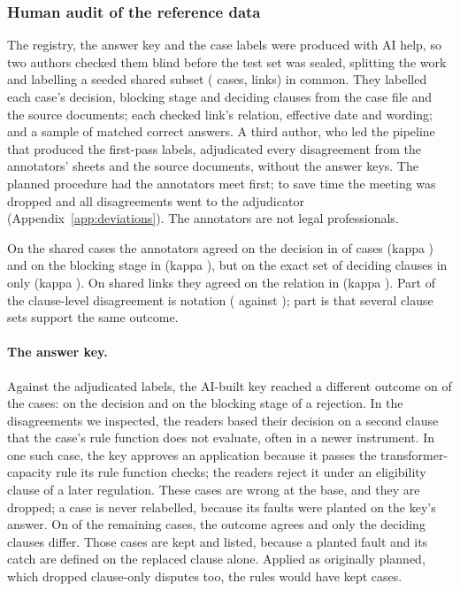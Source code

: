 \subsubsection{Human audit of the reference data}
\label{sec:annotation}
The registry, the answer key and the case labels were produced with AI help, so two authors checked them blind before
the test set was sealed, splitting the work and labelling a seeded shared subset (\NSharedCases{} cases, \NSharedLinks{}
links) in common. They labelled each case's decision, blocking stage and deciding clauses from the case file and the
source documents; each checked link's relation, effective date and wording; and a sample of \NControlsAnnotated{} matched
correct answers. A third author, who led the pipeline that produced the first-pass labels, adjudicated every
disagreement from the annotators' sheets and the source documents, without the answer keys. The planned procedure
had the annotators meet first; to save time the meeting was dropped and all disagreements went to the adjudicator
(Appendix~\ref{app:deviations}). The annotators are not legal professionals.

On the shared cases the annotators agreed on the decision in \AgreeCasesDecision{} of cases (kappa
\KappaCasesDecision{}) and on the blocking stage in \AgreeCasesBlockingStage{} (kappa \KappaCasesBlockingStage{}), but on
the exact set of deciding clauses in only \AgreeCasesDecidingClauses{} (kappa \KappaCasesDecidingClauses{}). On shared
links they agreed on the relation in \AgreeLinksRelation{} (kappa \KappaLinksRelation{}). Part of the clause-level
disagreement is notation ( against ); part is that several clause sets support the same outcome.

\paragraph{The answer key.}
Against the adjudicated labels, the AI-built key reached a different outcome on \NDroppedDecision{} of the
\NCandidateCases{} cases: \NDroppedDecisionOnly{} on the decision and \NDroppedBlockingStage{} on the blocking stage of a
rejection. In the disagreements we inspected, the readers based their decision on a second clause that the case's rule
function does not evaluate, often in a newer instrument. In one such case, the key approves an application because it passes the
transformer-capacity rule its rule function checks; the readers reject it under an eligibility clause of a later
regulation. These cases are wrong at the base, and they are dropped; a case is never relabelled, because its faults
were planted on the key's answer. On \NClauseDisputed{} of the remaining cases, the outcome agrees and only the deciding
clauses differ. Those cases are kept and listed, because a planted fault and its catch are defined on the replaced
clause alone. Applied as originally planned, which dropped clause-only disputes too, the rules would have kept
\NStrictKept{} cases.

